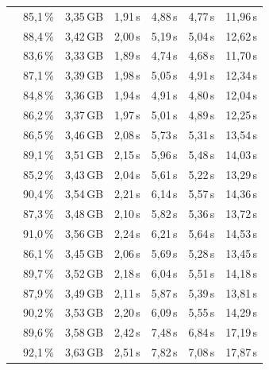 \begin{table}[H]
\begin{tabularx}{\textwidth}{C C C C C C C}
                       & 85{,}1\,\% & 3{,}35\,GB & 1{,}91\,s & 4{,}88\,s & 4{,}77\,s & 11{,}96\,s \\
                       & 88{,}4\,\% & 3{,}42\,GB & 2{,}00\,s & 5{,}19\,s & 5{,}04\,s & 12{,}62\,s \\
                       & 83{,}6\,\% & 3{,}33\,GB & 1{,}89\,s & 4{,}74\,s & 4{,}68\,s & 11{,}70\,s \\
                       & 87{,}1\,\% & 3{,}39\,GB & 1{,}98\,s & 5{,}05\,s & 4{,}91\,s & 12{,}34\,s \\
                       & 84{,}8\,\% & 3{,}36\,GB & 1{,}94\,s & 4{,}91\,s & 4{,}80\,s & 12{,}04\,s \\
                       & 86{,}2\,\% & 3{,}37\,GB & 1{,}97\,s & 5{,}01\,s & 4{,}89\,s & 12{,}25\,s \\
    \addlinespace[2pt]
                      & 86{,}5\,\% & 3{,}46\,GB & 2{,}08\,s & 5{,}73\,s & 5{,}31\,s & 13{,}54\,s \\
                       & 89{,}1\,\% & 3{,}51\,GB & 2{,}15\,s & 5{,}96\,s & 5{,}48\,s & 14{,}03\,s \\
                       & 85{,}2\,\% & 3{,}43\,GB & 2{,}04\,s & 5{,}61\,s & 5{,}22\,s & 13{,}29\,s \\
                       & 90{,}4\,\% & 3{,}54\,GB & 2{,}21\,s & 6{,}14\,s & 5{,}57\,s & 14{,}36\,s \\
                       & 87{,}3\,\% & 3{,}48\,GB & 2{,}10\,s & 5{,}82\,s & 5{,}36\,s & 13{,}72\,s \\
                       & 91{,}0\,\% & 3{,}56\,GB & 2{,}24\,s & 6{,}21\,s & 5{,}64\,s & 14{,}53\,s \\
                       & 86{,}1\,\% & 3{,}45\,GB & 2{,}06\,s & 5{,}69\,s & 5{,}28\,s & 13{,}45\,s \\
                       & 89{,}7\,\% & 3{,}52\,GB & 2{,}18\,s & 6{,}04\,s & 5{,}51\,s & 14{,}18\,s \\
                       & 87{,}9\,\% & 3{,}49\,GB & 2{,}11\,s & 5{,}87\,s & 5{,}39\,s & 13{,}81\,s \\
                       & 90{,}2\,\% & 3{,}53\,GB & 2{,}20\,s & 6{,}09\,s & 5{,}55\,s & 14{,}29\,s \\
    \addlinespace[2pt]
                      & 89{,}6\,\% & 3{,}58\,GB & 2{,}42\,s & 7{,}48\,s & 6{,}84\,s & 17{,}19\,s \\
                       & 92{,}1\,\% & 3{,}63\,GB & 2{,}51\,s & 7{,}82\,s & 7{,}08\,s & 17{,}87\,s \\

\end{tabularx}
\end{table}
